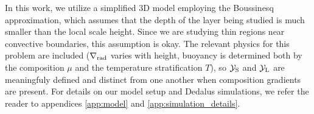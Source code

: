In this work, we utilize a simplified 3D model employing the Boussinesq approximation, which assumes that the depth of the layer being studied is much smaller than the local scale height.
Since we are studying thin regions near convective boundaries, this assumption is okay.
The relevant physics for this problem are included ($\nabla_{\rm{rad}}$ varies with height, buoyancy is determined both by the composition $\mu$ and the temperature stratification $T$), so $\mathcal{Y}_{\rm{S}}$ and $\mathcal{Y}_{\rm{L}}$ are meaningfuly defined and distinct from one another when composition gradients are present.
For details on our model setup and Dedalus simulations, we refer the reader to appendices \ref{app:model} and \ref{app:simulation_details}.
